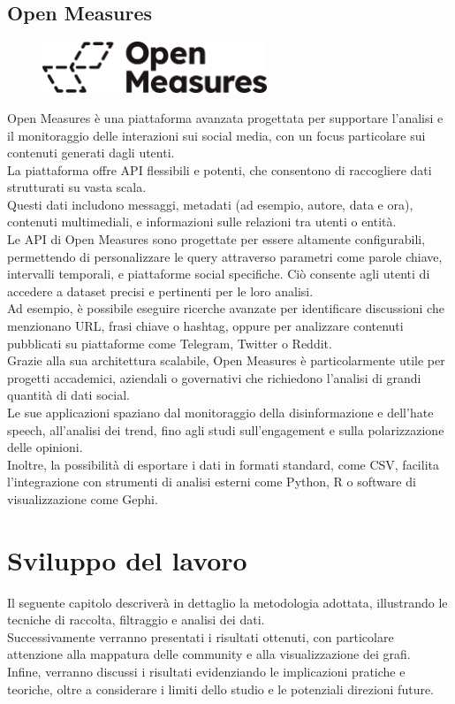 \documentclass[12pt]{article}
\begin{document}
	\subsection{Open Measures}
	\begin{figure}[H]
		\centering
		\includegraphics[width=0.6\textwidth]{immagini/openmeasures}
	\end{figure}
	Open Measures è una piattaforma avanzata progettata per supportare l'analisi e il monitoraggio delle interazioni sui social media, con un focus particolare sui contenuti generati dagli utenti.\\
	La piattaforma offre API flessibili e potenti, che consentono di raccogliere dati strutturati su vasta scala.\\
	Questi dati includono messaggi, metadati (ad esempio, autore, data e ora), contenuti multimediali, e informazioni sulle relazioni tra utenti o entità.
	\\
	Le API di Open Measures sono progettate per essere altamente configurabili, permettendo di personalizzare le query attraverso parametri come parole chiave, intervalli temporali, e piattaforme social specifiche. Ciò consente agli utenti di accedere a dataset precisi e pertinenti per le loro analisi.\\ 
	Ad esempio, è possibile eseguire ricerche avanzate per identificare discussioni che menzionano URL, frasi chiave o hashtag, oppure per analizzare contenuti pubblicati su piattaforme come Telegram, Twitter o Reddit.
	\\
	Grazie alla sua architettura scalabile, Open Measures è particolarmente utile per progetti accademici, aziendali o governativi che richiedono l'analisi di grandi quantità di dati social.\\ 
	Le sue applicazioni spaziano dal monitoraggio della disinformazione e dell'hate speech, all'analisi dei trend, fino agli studi sull'engagement e sulla polarizzazione delle opinioni.\\ 
	Inoltre, la possibilità di esportare i dati in formati standard, come CSV, facilita l'integrazione con strumenti di analisi esterni come Python, R o software di visualizzazione come Gephi.
	\newpage
	\section{Sviluppo del lavoro}
	Il seguente capitolo descriverà in dettaglio la metodologia adottata, illustrando le tecniche di raccolta, filtraggio e analisi dei dati.\\
	Successivamente verranno presentati i risultati ottenuti, con particolare attenzione alla mappatura delle community e alla visualizzazione dei grafi.\\
	Infine, verranno discussi i risultati evidenziando le implicazioni pratiche e teoriche, oltre a considerare i limiti dello studio e le potenziali direzioni future.
\end{document}
